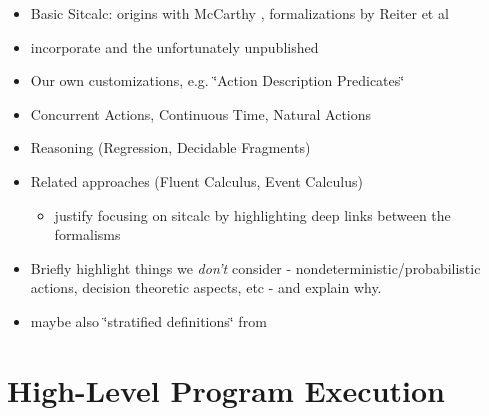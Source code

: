 \begin{itemize}
\item Basic Sitcalc: origins with McCarthy \cite{McCHay69sitcalc}, formalizations
by Reiter et al \cite{reiter01kia,pirri99contributions_sitcalc,levesque98sc_foundations} 
\item incorporate \cite{pinto99ramification,pinto98interacting_effects}
and the unfortunately unpublished \cite{pinto00action_interaction} 
\item Our own customizations, e.g. \char`\"{}Action Description Predicates\char`\"{}
\cite{kelly07sc_persistence} 
\item Concurrent Actions, Continuous Time, Natural Actions \cite{pinto94temporal,reiter96sc_nat_conc} 
\item Reasoning (Regression, Decidable Fragments) 
\item Related approaches (Fluent Calculus, Event Calculus) 

\begin{itemize}
\item justify focusing on sitcalc by highlighting deep links between the
formalisms 
\end{itemize}
\item Briefly highlight things we \emph{don't} consider - nondeterministic/probabilistic
actions, decision theoretic aspects, etc - and explain why. 
\item maybe also \char`\"{}stratified definitions\char`\"{} from \cite{pinto94temporal} 
\end{itemize}

\section{High-Level Program Execution}

